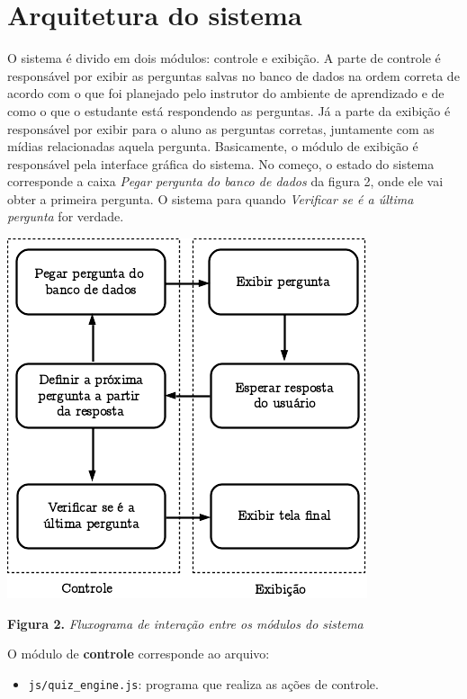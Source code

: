 \documentclass{article}
\begin{document}
\newpage
\section{Arquitetura do sistema}

O sistema é divido em dois módulos: controle e exibição. A parte de controle é responsável por exibir as perguntas salvas no banco de dados na ordem correta de acordo com o que foi planejado pelo instrutor do ambiente de aprendizado e de como o que o estudante está respondendo as perguntas. Já a parte da exibição é responsável por exibir para o aluno as perguntas corretas, juntamente com as mídias relacionadas aquela pergunta. Basicamente, o módulo de exibição é responsável pela interface gráfica do sistema. No começo, o estado do sistema corresponde a caixa \textit{Pegar pergunta do banco de dados} da figura 2, onde ele vai obter a primeira pergunta. O sistema para quando \textit{Verificar se é a última pergunta} for verdade.
\newline

\begin{center}
\includegraphics{fluxo}
\end{center}
\begin{center}
\textbf{Figura 2.} \textit{Fluxograma de interação entre os módulos do sistema}
\end{center}

O módulo de \textbf{controle} corresponde ao arquivo:
\begin{itemize}
\item \texttt{js/quiz\_engine.js}: programa que realiza as ações de controle.\\
\end{itemize}
\end{document}
